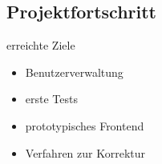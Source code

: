 \subsection{Projektfortschritt}

\begin{frame}{\insertsectionhead}{\insertsubsectionhead}
  \begin{block}{erreichte Ziele}
    \begin{itemize}
      \item Benutzerverwaltung
      \item erste Tests
      \item prototypisches Frontend
      \item Verfahren zur Korrektur
    \end{itemize}
  \end{block}
\end{frame}

